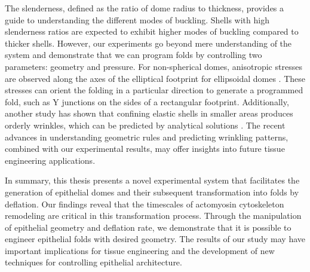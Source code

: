 The slenderness, defined as the ratio of dome radius to thickness, provides a guide to understanding the different modes of buckling. Shells with high slenderness ratios are expected to exhibit higher modes of buckling compared to thicker shells. However, our experiments go beyond mere understanding of the system and demonstrate that we can program folds by controlling two parameters: geometry and pressure. For non-spherical domes, anisotropic stresses are observed along the axes of the elliptical footprint for ellipsoidal domes \cite{marin-llaurado2022}. These stresses can orient the folding in a particular direction to generate a programmed fold, such as Y junctions on the sides of a rectangular footprint. Additionally, another study has shown that confining elastic shells in smaller areas produces orderly wrinkles, which can be predicted by analytical solutions \cite{tobasco2022}. The recent advances in understanding geometric rules and predicting wrinkling patterns, combined with our experimental results, may offer insights into future tissue engineering applications.

In summary, this thesis presents a novel experimental system that facilitates the generation of epithelial domes and their subsequent transformation into folds by deflation. Our findings reveal that the timescales of actomyosin cytoskeleton remodeling are critical in this transformation process. Through the manipulation of epithelial geometry and deflation rate, we demonstrate that it is possible to engineer epithelial folds with desired geometry. The results of our study may have important implications for tissue engineering and the development of new techniques for controlling epithelial architecture.
